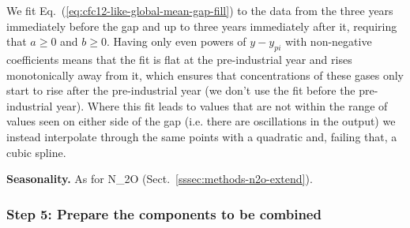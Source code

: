 We fit Eq.~(\ref{eq:cfc12-like-global-mean-gap-fill})
to the data from the three years immediately before the gap
and up to three years immediately after it, requiring that $a \geq 0$ and $b \geq 0$.
Having only even powers of $y - y_{pi}$ with non-negative coefficients
means that the fit is flat at the pre-industrial year
and rises monotonically away from it,
which ensures that concentrations of these gases only start to rise after the pre-industrial year
(we don't use the fit before the pre-industrial year).
Where this fit leads to values that are not within the range of values seen on either side of the gap
(i.e. there are oscillations in the output)
we instead interpolate through the same points with a quadratic and, failing that, a cubic spline.

\textbf{Seasonality.}
As for N_2O (Sect.~\ref{sssec:methods-n2o-extend}).

\subsubsection{Step 5: Prepare the components to be combined}
\label{sssec:methods-cfc12-like-prepare-components}

